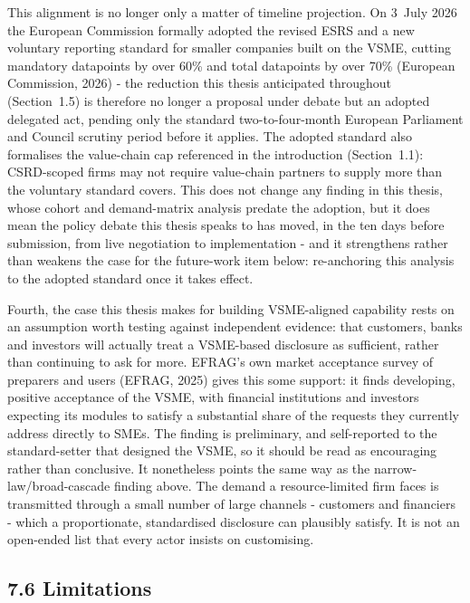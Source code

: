 \documentclass[
]{article}
\newcounter{none} %
\begin{document}
This alignment is no longer only a matter of timeline projection. On 3~July
2026 the European Commission formally adopted the revised ESRS and a new
voluntary reporting standard for smaller companies built on the VSME,
cutting mandatory datapoints by over 60\% and total datapoints by over 70\%
(European Commission, 2026) - the reduction this thesis anticipated
throughout (Section~1.5) is therefore no longer a proposal under debate but
an adopted delegated act, pending only the standard two-to-four-month
European Parliament and Council scrutiny period before it applies. The
adopted standard also formalises the value-chain cap referenced in the
introduction (Section~1.1): CSRD-scoped firms may not require value-chain
partners to supply more than the voluntary standard covers. This does not
change any finding in this thesis, whose cohort and demand-matrix analysis
predate the adoption, but it does mean the policy debate this thesis speaks
to has moved, in the ten days before submission, from live negotiation to
implementation - and it strengthens rather than weakens the case for the
future-work item below: re-anchoring this analysis to the adopted standard
once it takes effect.

Fourth, the case this thesis makes for building VSME-aligned capability rests
on an assumption worth testing against independent evidence: that customers,
banks and investors will actually treat a VSME-based disclosure as
sufficient, rather than continuing to ask for more. EFRAG's own market
acceptance survey of preparers and users (EFRAG, 2025) gives this some
support: it finds developing, positive acceptance of the VSME, with
financial institutions and investors expecting its modules to satisfy a
substantial share of the requests they currently address directly to SMEs.
The finding is preliminary, and self-reported to the standard-setter that
designed the VSME, so it should be read as encouraging rather than conclusive.
It nonetheless points the same way as the narrow-law/broad-cascade finding
above. The demand a resource-limited firm faces is transmitted through a small
number of large channels - customers and financiers - which a proportionate,
standardised disclosure can plausibly satisfy. It is not an open-ended list that
every actor insists on customising.

\subsection{7.6 Limitations}\label{discussion-limitations}
\end{document}

